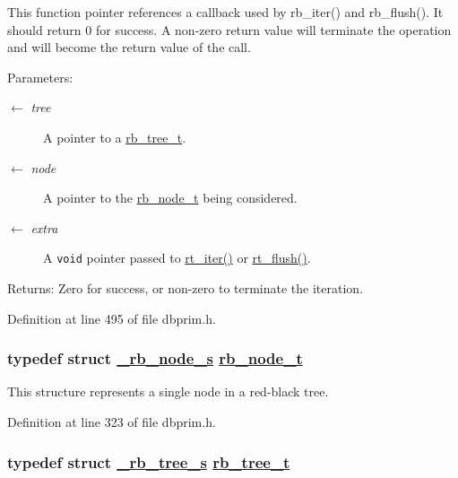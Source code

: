 This function pointer references a callback used by rb\_\-iter() and rb\_\-flush(). It should return 0 for success. A non-zero return value will terminate the operation and will become the return value of the call.

\begin{Desc}
\item[Parameters:]
\begin{description}
\item[\mbox{$\leftarrow$} {\em tree}]A pointer to a \hyperlink{group__dbprim__rbtree_ga0}{rb\_\-tree\_\-t}. \item[\mbox{$\leftarrow$} {\em node}]A pointer to the \hyperlink{group__dbprim__rbtree_ga1}{rb\_\-node\_\-t} being considered. \item[\mbox{$\leftarrow$} {\em extra}]A {\tt void} pointer passed to \hyperlink{group__dbprim__rbtree_ga11}{rt\_\-iter()} or \hyperlink{group__dbprim__rbtree_ga12}{rt\_\-flush()}.\end{description}
\end{Desc}
\begin{Desc}
\item[Returns:]Zero for success, or non-zero to terminate the iteration.\end{Desc}


Definition at line 495 of file dbprim.h.\hypertarget{group__dbprim__rbtree_ga1}{
\subsubsection[rb\_\-node\_\-t]{\setlength{\rightskip}{0pt plus 5cm}typedef struct \hyperlink{struct__rb__node__s}{\_\-rb\_\-node\_\-s} \hyperlink{struct__rb__node__s}{rb\_\-node\_\-t}}}
\label{group__dbprim__rbtree_ga1}


This structure represents a single node in a red-black tree.

Definition at line 323 of file dbprim.h.\hypertarget{group__dbprim__rbtree_ga0}{
\subsubsection[rb\_\-tree\_\-t]{\setlength{\rightskip}{0pt plus 5cm}typedef struct \hyperlink{struct__rb__tree__s}{\_\-rb\_\-tree\_\-s} \hyperlink{struct__rb__tree__s}{rb\_\-tree\_\-t}}}
\label{group__dbprim__rbtree_ga0}



